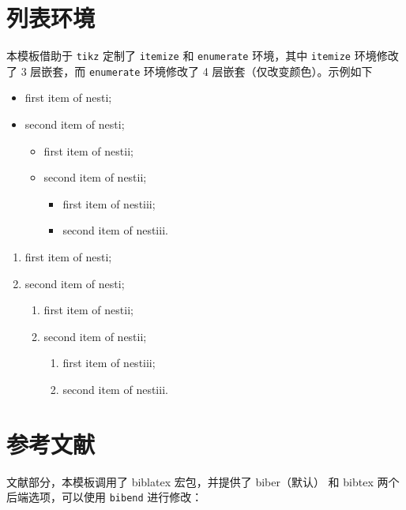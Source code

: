 \documentclass[lang=cn,10pt,cite=super]{elegantbook}
\begin{document}
\section{列表环境}
本模板借助于 \lstinline{tikz} 定制了 \lstinline{itemize} 和 \lstinline{enumerate} 环境，其中 \lstinline{itemize} 环境修改了 3 层嵌套，而 \lstinline{enumerate} 环境修改了 4 层嵌套（仅改变颜色）。示例如下\\[2ex]
\begin{minipage}[b]{0.49\textwidth}
  \begin{itemize}
    \item first item of nesti;
    \item second item of nesti;
      \begin{itemize}
        \item first item of nestii;
        \item second item of nestii;
        \begin{itemize}
          \item first item of nestiii;
          \item second item of nestiii.
        \end{itemize}   
      \end{itemize}
  \end{itemize}
\end{minipage}
\begin{minipage}[b]{0.49\textwidth}
  \begin{enumerate}
    \item first item of nesti;
    \item second item of nesti;
      \begin{enumerate}
        \item first item of nestii;
        \item second item of nestii;
        \begin{enumerate}
          \item first item of nestiii;
          \item second item of nestiii.
        \end{enumerate}   
      \end{enumerate}
  \end{enumerate}
\end{minipage}

\section{参考文献}
文献部分，本模板调用了 biblatex 宏包，并提供了 biber（默认） 和 bibtex 两个后端选项，可以使用 \lstinline{bibend} 进行修改：
\end{document}
